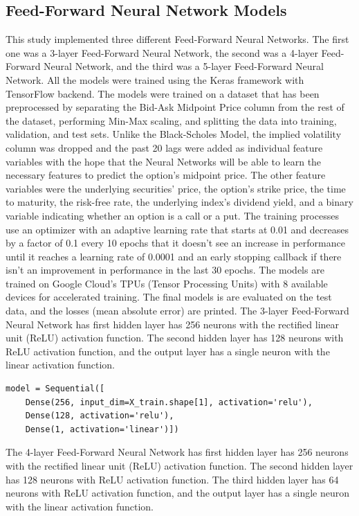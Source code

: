 \documentclass[a4paper]{article}
\begin{document}
\subsection{Feed-Forward Neural Network Models}
This study implemented three different Feed-Forward Neural Networks. The first one was a 3-layer Feed-Forward Neural Network, the second was a 4-layer Feed-Forward Neural Network, and the third was a 5-layer Feed-Forward Neural Network. All the models were trained using the Keras framework with TensorFlow backend. The models were trained on a dataset that has been preprocessed by separating the Bid-Ask Midpoint Price column from the rest of the dataset, performing Min-Max scaling, and splitting the data into training, validation, and test sets. Unlike the Black-Scholes Model, the implied volatility column was dropped and the past 20 lags were added as individual feature variables with the hope that the Neural Networks will be able to learn the necessary features to predict the option's midpoint price. The other feature variables were the underlying securities' price, the option's strike price, the time to maturity, the risk-free rate, the underlying index's dividend yield, and a binary variable indicating whether an option is a call or a put. The training processes use an optimizer with an adaptive learning rate that starts at 0.01 and decreases by a factor of 0.1 every 10 epochs that it doesn't see an increase in performance until it reaches a learning rate of 0.0001 and an early stopping callback if there isn't an improvement in performance in the last 30 epochs. The models are trained on Google Cloud's TPUs (Tensor Processing Units) with 8 available devices for accelerated training. The final models is are evaluated on the test data, and the losses (mean absolute error) are printed. 
The 3-layer Feed-Forward Neural Network has first hidden layer has 256 neurons with the rectified linear unit (ReLU) activation function. The second hidden layer has 128 neurons with ReLU activation function, and the output layer has a single neuron with the linear activation function.
\begin{lstlisting}[style=pythoncode, caption=3 Layer Feed-Forward Neural Network, label=lst:model_2]
model = Sequential([
    Dense(256, input_dim=X_train.shape[1], activation='relu'),
    Dense(128, activation='relu'),
    Dense(1, activation='linear')])

\end{lstlisting}
The 4-layer Feed-Forward Neural Network has first hidden layer has 256 neurons with the rectified linear unit (ReLU) activation function. The second hidden layer has 128 neurons with ReLU activation function. The third hidden layer has 64 neurons with ReLU activation function, and the output layer has a single neuron with the linear activation function.
\end{document}
